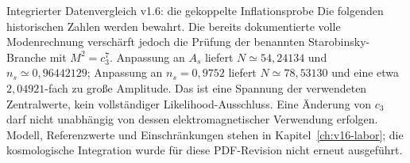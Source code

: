 \begin{grenze}{Integrierter Datenvergleich v1.6: die gekoppelte Inflationsprobe}
Die folgenden historischen Zahlen werden bewahrt. Die bereits dokumentierte volle Modenrechnung verschärft jedoch die Prüfung der benannten Starobinsky-Branche mit $M^2=c_3^7$. Anpassung an $A_s$ liefert $N\simeq54{,}24134$ und $n_s\simeq0{,}96442129$; Anpassung an $n_s=0{,}9752$ liefert $N\simeq78{,}53130$ und eine etwa $2{,}04921$-fach zu große Amplitude. Das ist eine Spannung der verwendeten Zentralwerte, kein vollständiger Likelihood-Ausschluss. Eine Änderung von $c_3$ darf nicht unabhängig von dessen elektromagnetischer Verwendung erfolgen. Modell, Referenzwerte und Einschränkungen stehen in Kapitel~\ref{ch:v16-labor}; die kosmologische Integration wurde für diese PDF-Revision nicht erneut ausgeführt.
\end{grenze}
